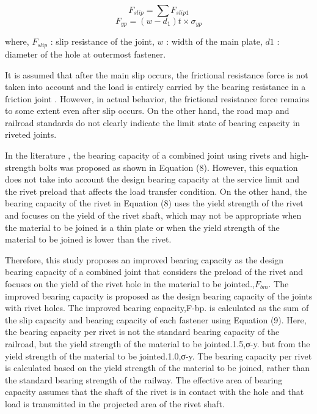 \begin{equation}\label{fslip-ch3}
    F_{slip} = \sum F_{slip1}
\end{equation}
\begin{equation}\label{fslip-ch3}
    F_{yp} = (w-d_1)t\times \sigma_{yp}
\end{equation}

where, $F_{slip}$ : slip resistance of the joint, $w$ : width of the main plate, $d1$ : diameter of the hole at outermost fastener.

It is assumed that after the main slip occurs, the frictional resistance force is not taken into account and the load is entirely carried by the bearing resistance in a friction joint \cite{rivet1977}. However, in actual behavior, the frictional resistance force remains to some extent even after slip occurs. On the other hand, the road map and railroad standards do not clearly indicate the limit state of bearing capacity in riveted joints.

In the literature \cite{hashimoto2008}, the bearing capacity of a combined joint using rivets and high-strength bolts was proposed as shown in Equation (8). However, this equation does not take into account the design bearing capacity at the service limit and the rivet preload that affects the load transfer condition. On the other hand, the bearing capacity of the rivet in Equation (8) uses the yield strength of the rivet and focuses on the yield of the rivet shaft, which may not be appropriate when the material to be joined is a thin plate or when the yield strength of the material to be joined is lower than the rivet.

Therefore, this study proposes an improved bearing capacity as the design bearing capacity of a combined joint that considers the preload of the rivet and focuses on the yield of the rivet hole in the material to be jointed.,$F_{bm}$. The improved bearing capacity is proposed as the design bearing capacity of the joints with rivet holes. The improved bearing capacity,F-bp. is calculated as the sum of the slip capacity and bearing capacity of each fastener using Equation (9). Here, the bearing capacity per rivet is not the standard bearing capacity of the railroad, but the yield strength of the material to be jointed.1.5,σ-y. but from the yield strength of the material to be jointed.1.0,σ-y. The bearing capacity per rivet is calculated based on the yield strength of the material to be joined, rather than the standard bearing strength of the railway. The effective area of bearing capacity assumes that the shaft of the rivet is in contact with the hole and that load is transmitted in the projected area of the rivet shaft.

